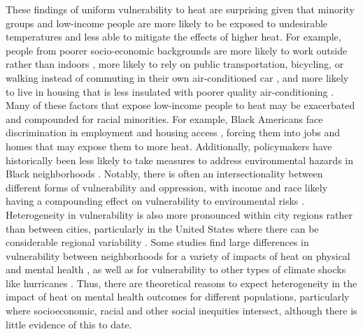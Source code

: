 \documentclass[fleqn,10pt]{wlscirep}
\begin{document}
These findings of uniform vulnerability to heat are surprising given that minority groups and low-income people are more likely to be exposed to undesirable temperatures and less able to mitigate the effects of higher heat. For example, people from poorer socio-economic backgrounds are more likely to work outside rather than indoors \cite{Gubernot2014Oct}, more likely to rely on public transportation, bicycling, or walking instead of commuting in their own air-conditioned car \cite{Karner2015Dec}, and more likely to live in housing that is less insulated with poorer quality air-conditioning \cite{Samuelson2020Jun}. Many of these factors that expose low-income people to heat may be exacerbated and compounded for racial minorities. For example, Black Americans face discrimination in employment \cite{Reid2003, Kang2016, Penner2008} and housing access \cite{Desmond2015, Akbar2019}, forcing them into jobs and homes that may expose them to more heat. Additionally, policymakers have historically been less likely to take measures to address environmental hazards in Black neighborhoods \cite{Banzhaf2019}. Notably, there is often an intersectionality between different forms of vulnerability and oppression, with income and race likely having a compounding effect on vulnerability to environmental risks \cite{Kuran2020Nov}. Heterogeneity in vulnerability is also more pronounced within city regions rather than between cities, particularly in the United States where there can be considerable regional variability \cite{Cardona2012Jan}. Some studies find large differences in vulnerability between neighborhoods for a variety of impacts of heat on physical and mental health \cite{Belanger2015Mar, Uejio2011Mar}, as well as for vulnerability to other types of climate shocks like hurricanes \cite{ferre2019hurricane, Gruebner2015Jun}. Thus, there are theoretical reasons to expect heterogeneity in the impact of heat on mental health outcomes for different populations, particularly where socioeconomic, racial and other social inequities intersect, although there is little evidence of this to date. 
\end{document}

